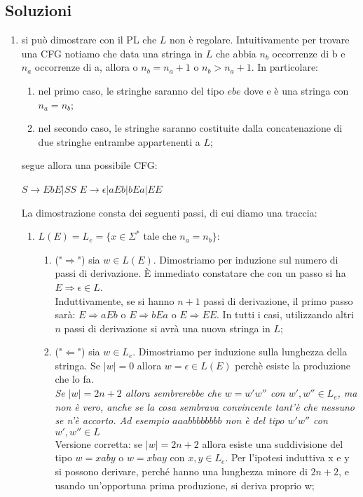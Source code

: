 \documentclass[a4paper,11pt]{article}
\begin{document}
\subsection{Soluzioni}
\begin{enumerate}
    \item si può dimostrare con il PL che $L$ non è regolare. Intuitivamente per trovare una CFG notiamo che data una stringa in $L$ che abbia $n_b$ occorrenze di b e $n_a$ occorrenze di a, allora o $n_b=n_a+1$ o $n_b>n_a+1$. In particolare:
    \begin{enumerate}
        \item nel primo caso, le stringhe saranno del tipo $ebe$ dove e è una stringa con $n_a=n_b$;
        \item nel secondo caso, le stringhe saranno costituite dalla concatenazione di due stringhe entrambe appartenenti a $L$;
    \end{enumerate}
    segue allora una possibile CFG:\\
    \begin{minipage}{\linewidth}
        \centering $S \rightarrow EbE|SS$
        \centering $E \rightarrow \epsilon | aEb | bEa | EE$
    \end{minipage}
    La dimostrazione consta dei seguenti passi, di cui diamo una traccia:
    \begin{enumerate}
        \item $L(E)=L_e=\{x\in \Sigma ^*$ tale che $n_a=n_b\}$:
        \begin{enumerate}
            \item ("$\Rightarrow$") sia $w\in L(E)$. Dimostriamo per induzione sul numero di passi di derivazione. È immediato constatare che con un passo si ha $E\Rightarrow \epsilon \in L$.\\Induttivamente, se si hanno $n+1$ passi di derivazione, il primo passo sarà: $E\Rightarrow aEb$ o $E\Rightarrow bEa$ o $E\Rightarrow EE$. In tutti i casi, utilizzando altri $n$ passi di derivazione si avrà una nuova stringa in $L$;
            \item ("$\Leftarrow$") sia $w\in L_e$. Dimostriamo per induzione sulla lunghezza della stringa. Se $|w|=0$ allora $w=\epsilon \in L(E)$ perchè esiste la produzione che lo fa.\\\textit{Se $|w|=2n+2$ allora sembrerebbe che $w=w'w''$ con $w',w''\in L_e$, ma non è vero, anche se la cosa sembrava convincente tant'è che nessuno se n'è accorto. Ad esempio $aaabbbbbbbb$ non è del tipo $w'w''$ con $w',w''\in L$}\\Versione corretta: se $|w|=2n+2$ allora esiste una suddivisione del tipo $w=xaby$ o $w=xbay$ con $x,y\in L_e$. Per l'ipotesi induttiva x e y si possono derivare, perché hanno una lunghezza minore di $2n+2$, e usando un'opportuna prima produzione, si deriva proprio w;

\end{enumerate}
\end{enumerate}
\end{enumerate}
\end{document}

